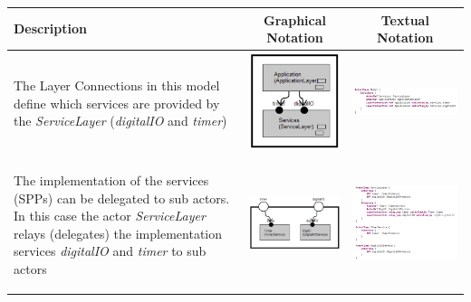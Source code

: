 \begin{table}
\begin{tabular}{|m{3cm}|c|c|}
\hline
 \textbf{Description} & \textbf{Graphical Notation} & \textbf{Textual Notation} \\ \hline
 \begin{flushleft}The Layer Connections in this model define which services are provided by the 
\textit{ServiceLayer} (\textit{digitalIO} and \textit{timer})\end{flushleft} & 
\includegraphics[scale=0.5]{images/040-LayeringModel.png} & 
\includegraphics[scale=0.5]{images/040-LayeringModelTextual.png}  \\ \hline
 \begin{flushleft}The implementation of the services (SPPs) can be delegated to sub actors. In this case 
the actor \textit{ServiceLayer} relays (delegates) the implementation services \textit{digitalIO} and 
\textit{timer} to sub actors\end{flushleft} & 
\includegraphics[scale=0.5]{images/040-LayeringServiceLayer.png} & 
\includegraphics[scale=0.5]{images/040-LayeringServiceLayerTextual.png} \\ \hline

\end{tabular}
\end{table}
